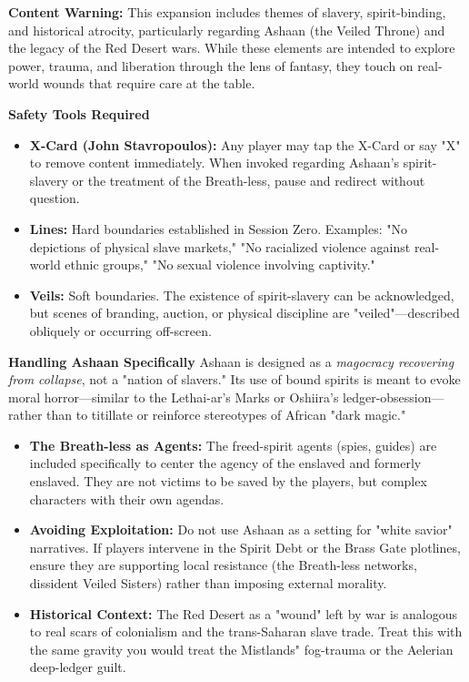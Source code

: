 \documentclass[11pt]{book}
\begin{document}
\begin{tcolorbox}[colback=black!5!white,colframe=crimson!75!black,title=Lines and Veils: Navigating Ashaan and Historical Trauma]
\textbf{Content Warning:} This expansion includes themes of slavery, spirit-binding, and historical atrocity, particularly regarding Ashaan (the Veiled Throne) and the legacy of the Red Desert wars. While these elements are intended to explore power, trauma, and liberation through the lens of fantasy, they touch on real-world wounds that require care at the table.

\textbf{Safety Tools Required}
\begin{itemize}
    \item \textbf{X-Card (John Stavropoulos):} Any player may tap the X-Card or say "X" to remove content immediately. When invoked regarding Ashaan's spirit-slavery or the treatment of the Breath-less, pause and redirect without question.
    \item \textbf{Lines:} Hard boundaries established in Session Zero. Examples: "No depictions of physical slave markets," "No racialized violence against real-world ethnic groups," "No sexual violence involving captivity."
    \item \textbf{Veils:} Soft boundaries. The existence of spirit-slavery can be acknowledged, but scenes of branding, auction, or physical discipline are "veiled"---described obliquely or occurring off-screen.
\end{itemize}

\textbf{Handling Ashaan Specifically}
Ashaan is designed as a \textit{magocracy recovering from collapse}, not a "nation of slavers." Its use of bound spirits is meant to evoke moral horror---similar to the Lethai-ar's Marks or Oshiira's ledger-obsession---rather than to titillate or reinforce stereotypes of African "dark magic." 

\begin{itemize}
    \item \textbf{The Breath-less as Agents:} The freed-spirit agents (spies, guides) are included specifically to center the agency of the enslaved and formerly enslaved. They are not victims to be saved by the players, but complex characters with their own agendas.
    \item \textbf{Avoiding Exploitation:} Do not use Ashaan as a setting for "white savior" narratives. If players intervene in the Spirit Debt or the Brass Gate plotlines, ensure they are supporting local resistance (the Breath-less networks, dissident Veiled Sisters) rather than imposing external morality.
    \item \textbf{Historical Context:} The Red Desert as a "wound" left by war is analogous to real scars of colonialism and the trans-Saharan slave trade. Treat this with the same gravity you would treat the Mistlands" fog-trauma or the Aelerian deep-ledger guilt.
\end{itemize}


\end{tcolorbox}
\end{document}
